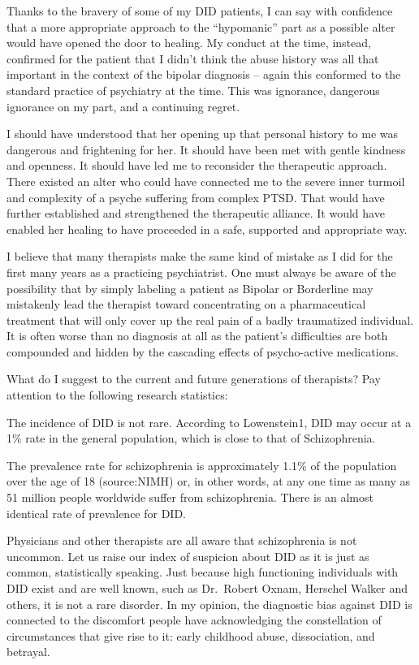 \documentclass[]{book}
\begin{document}
Thanks to the bravery of some of my DID patients, I can say with confidence that a more appropriate approach to the ``hypomanic'' part as a possible alter would have opened the door to healing. My conduct at the time, instead, confirmed for the patient that I didn't think the abuse history was all that important in the context of the bipolar diagnosis -- again this conformed to the standard practice of psychiatry at the time. This was ignorance, dangerous ignorance on my part, and a continuing regret.

I should have understood that her opening up that personal history to me was dangerous and frightening for her. It should have been met with gentle kindness and openness. It should have led me to reconsider the therapeutic approach. There existed an alter who could have connected me to the severe inner turmoil and complexity of a psyche suffering from complex PTSD. That would have further established and strengthened the therapeutic alliance. It would have enabled her healing to have proceeded in a safe, supported and appropriate way.

I believe that many therapists make the same kind of mistake as I did for the first many years as a practicing psychiatrist. One must always be aware of the possibility that by simply labeling a patient as Bipolar or Borderline may mistakenly lead the therapist toward concentrating on a pharmaceutical treatment that will only cover up the real pain of a badly traumatized individual. It is often worse than no diagnosis at all as the patient's difficulties are both compounded and hidden by the cascading effects of psycho-active medications.

What do I suggest to the current and future generations of therapists? Pay attention to the following research statistics:

The incidence of DID is not rare. According to Lowenstein1, DID may occur at a 1\% rate in the general population, which is close to that of Schizophrenia.

The prevalence rate for schizophrenia is approximately 1.1\% of the population over the age of 18 (source:NIMH) or, in other words, at any one time as many as 51 million people worldwide suffer from schizophrenia. There is an almost identical rate of prevalence for DID.

Physicians and other therapists are all aware that schizophrenia is not uncommon. Let us raise our index of suspicion about DID as it is just as common, statistically speaking. Just because high functioning individuals with DID exist and are well known, such as Dr.~Robert Oxnam, Herschel Walker and others, it is not a rare disorder. In my opinion, the diagnostic bias against DID is connected to the discomfort people have acknowledging the constellation of circumstances that give rise to it: early childhood abuse, dissociation, and betrayal.
\end{document}
